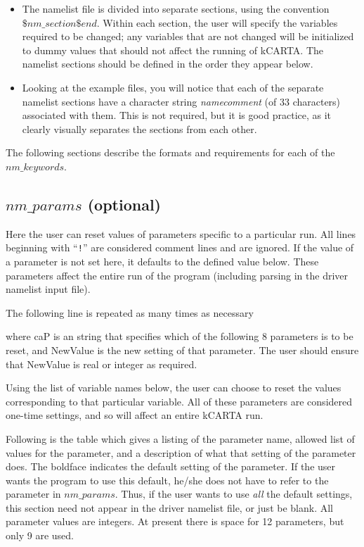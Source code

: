\documentclass[12pt]{article}
\newcommand{\kc}{\textsf{kCARTA}\xspace}
\newcommand{\ttab}{\indent\indent}
\begin{document}
\begin{itemize}
\item The namelist file is divided into separate sections, using the convention
 {$ \$nm\_section  \$end$}. Within each section, the user will specify the
 variables required to be changed; any variables that are not changed will be
 initialized to dummy values that should not affect the running of \kc. 
 The namelist sections should be defined in the order they appear below.
\item Looking at the example files, you will notice that each of the separate
  namelist sections have a character string {\em namecomment} (of 33 
  characters) associated with them. This is not required, but it is good 
  practice, as it clearly visually separates the sections from each other.
\end{itemize}

The following sections describe the formats and requirements for
each of the $nm\_keywords$.

\subsection{$nm\_params$ (optional)}

Here the user can reset values of parameters specific to a
particular run.  All lines beginning with ``{\tt !}'' are considered
comment lines and are ignored.  If the value of a parameter is not
set here, it defaults to the defined value below.  These parameters affect 
the entire run of the program (including parsing in the
driver namelist input file).

The following line is  repeated as many times as necessary

\medskip
\ttab {\sf caP = NewValue}
\medskip

\noindent
where {\sf caP} is an string that specifies which of the 
following 8 parameters is to be reset, and {\sf NewValue} is the new 
setting of that parameter.  The user should ensure that {\sf NewValue} 
is real or integer as required.

Using the list of variable names below, the user can choose to reset
the values corresponding to that particular variable.  All of these
parameters are considered one-time settings, and so will affect an
entire \kc run.

Following is the table which gives a listing of the parameter name,  
allowed list of values for the parameter, and a description of what that 
setting of the parameter does.  The boldface indicates the default setting 
of the parameter.  If the user wants the
program to use this default, he/she does not have to refer to the
parameter in $nm\_params$.  Thus, if the user wants to use {\em all} the
default settings, this section need not appear in the driver namelist
file, or just be blank.  All parameter values are integers. At present there is
space for 12 parameters, but only 9 are used.
\end{document}

